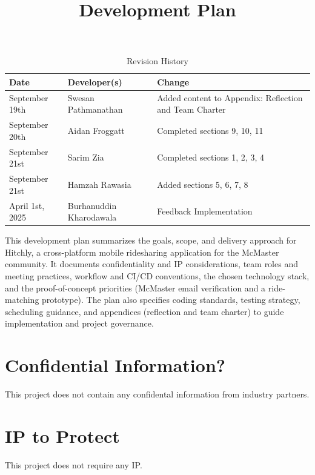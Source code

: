 \documentclass{article}
\title{Development Plan\\\progname}
\author{\authname}
\date{}
\begin{document}
\maketitle

\begin{table}[hp]
\caption{Revision History} \label{TblRevisionHistory}
\begin{tabularx}{\textwidth}{llX}
\toprule
\textbf{Date} & \textbf{Developer(s)} & \textbf{Change}\\
\midrule
September 19th & Swesan Pathmanathan & Added content to Appendix: Reflection and Team Charter\\
September 20th & Aidan Froggatt & Completed sections 9, 10, 11\\
September 21st & Sarim Zia & Completed sections 1, 2, 3, 4\\
September 21st & Hamzah Rawasia & Added sections 5, 6, 7, 8\\
April 1st, 2025 & Burhanuddin Kharodawala & Feedback Implementation\\

\bottomrule
\end{tabularx}
\end{table}

\newpage{}

This development plan summarizes the goals, scope, and delivery approach for Hitchly, a cross-platform mobile ridesharing application for the McMaster community. It documents confidentiality and IP considerations, team roles and meeting practices, workflow and CI/CD conventions, the chosen technology stack, and the proof-of-concept priorities (McMaster email verification and a ride-matching prototype). The plan also specifies coding standards, testing strategy, scheduling guidance, and appendices (reflection and team charter) to guide implementation and project governance.

\section{Confidential Information?}

This project does not contain any confidental information from industry partners.

\section{IP to Protect} 

This project does not require any IP.
\end{document}
